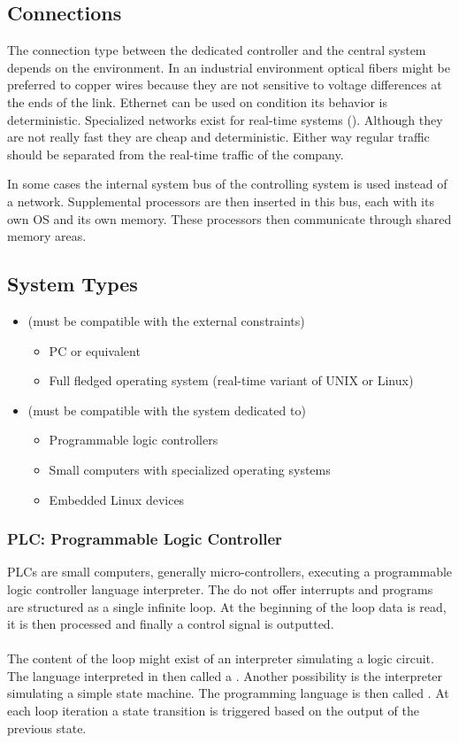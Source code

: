 \documentclass[../main.tex]{subfiles}
\begin{document}
\subsection{Connections}
The connection type between the dedicated controller and the central system depends on the environment.
In an industrial environment optical fibers might be preferred to copper wires because they are not sensitive to voltage differences at the ends of the link.
Ethernet can be used on condition its behavior is deterministic.
Specialized networks exist for real-time systems ().
Although they are not really fast they are cheap and deterministic. Either way regular traffic should be separated from the  real-time traffic of the company. 

In some cases the internal system bus of the controlling system is used instead of a network. Supplemental processors are then inserted in this bus, each with its own OS and its own memory. These processors then communicate through shared memory areas.

\subsection{System Types}
\begin{itemize}
	\item {} (must be compatible with the external constraints)
	\begin{itemize}
		\item PC or equivalent
		\item Full fledged operating system (real-time variant of UNIX or Linux)
	\end{itemize}
	\item {} (must be compatible with the system dedicated to)
	\begin{itemize}
		\item Programmable logic controllers
		\item Small computers with specialized operating systems
		\item Embedded Linux devices
	\end{itemize}
\end{itemize}

\subsubsection{PLC: Programmable Logic Controller}
PLCs are small computers, generally micro-controllers, executing a programmable logic controller language interpreter. The do not offer interrupts and programs are structured as a single infinite loop. At the beginning of the loop data is read, it is then processed and finally a control signal is outputted.
\\\\
The content of the loop might exist of an interpreter simulating a logic circuit. The language interpreted in then called a . Another possibility is the interpreter simulating a simple state machine. The programming language is then called . At each loop iteration a state transition is triggered based on the output of the previous state.
\end{document}
